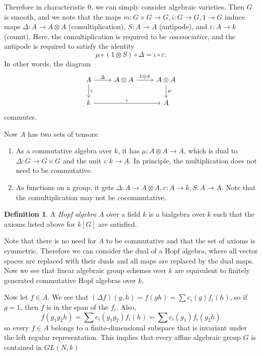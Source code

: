 \documentclass[leqno, openany]{memoir}
\theoremstyle{definition}
\newtheorem{defn}[thm]{Definition}
\theoremstyle{remark}
\theoremstyle{plain}
\theoremstyle{definition}
\theoremstyle{remark}
\newcommand{\ep}{\varepsilon}
\begin{document}
Therefore in characteristic $0$, we can simply consider algebraic varieties.
Then $G$ is smooth, and we note that the maps $m \colon G \times G \to G, i
\colon G \to G, 1 \to G$ induce maps $\Delta \colon A \to A \otimes A$
(comultiplication), $S \colon A \to A$ (antipode), and $\ep \colon A \to k$
(counit). Here, the comultiplication is required to be \textit{coassociative},
and the antipode is required to satisfy the identity \[ \mu \circ (1 \otimes S)
\circ \Delta = \iota \circ \ep. \] In other words, the diagram
\begin{equation*} \begin{tikzcd} A \arrow{r}{\Delta} \arrow{d}{\ep} & A \otimes
A \arrow{r}{1 \otimes S} & A \otimes A \arrow{d}{\mu} \\ k \arrow{rr}{\iota} &
                         & A \end{tikzcd} \end{equation*} commutes.

Now $A$ has two sets of tensors: \begin{enumerate} \item As a commutative
    algebra over $k$, it has $\mu \colon A \otimes A \to A$, which is dual to
    $\Delta \colon G \to G \times G$ and the unit $\iota \colon k \to A$. In
    principle, the multiplication does not need to be commutative.  \item As
    functions on a group, it gets $\Delta \colon A \to A \otimes A, \ep \colon
    A \to k, S \colon A \to A$. Note that the comultiplication may not be
    cocommutative.  \end{enumerate}

\begin{defn} A \textit{Hopf algebra} $A$ over a field $k$ is a bialgebra over
$k$ such that the axioms listed above for $k[G]$ are satisfied.  \end{defn}

Note that there is no need for $A$ to be commutative and that the set of axioms
is symmetric. Therefore we can consider the dual of a Hopf algebra, where all
vector spaces are replaced with their duals and all maps are replaced by the
dual maps. Now we see that linear algebraic group schemes over $k$ are
equivalent to finitely generated commutative Hopf algebras over $k$.

Now let $f \in A$. We see that $(\Delta f)(g,h) = f(gh) = \sum c_i(g) f_i(h)$,
so if $g = 1$, then $f$ is in the span of the $f_i$. Also, \[ f(g_1g_2h) = \sum
c_i (g_1g_2)f_i(h) = \sum c_i(g_1) f_i(g_2 h) \] so every $f \in A$ belongs to
a finite-dimensional subspace that is invariant under the left regular
representation. This implies that every affine algebraic group $G$ is contained
in $GL(N, k)$
\end{document}
